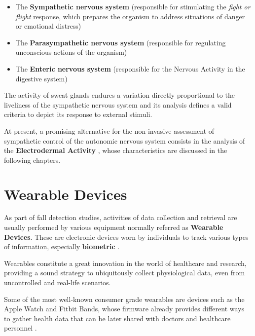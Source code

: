 \begin{itemize}
    \item The \textbf{Sympathetic nervous system} (responsible for stimulating the \textit{fight or flight} response, which prepares the organism to address situations of danger or emotional distress)
    \item The \textbf{Parasympathetic nervous system} (responsible for regulating unconscious actions of the organism)
    \item The \textbf{Enteric nervous system} (responsible for the Nervous Activity in the digestive system)
\end{itemize}

The activity of sweat glands endures a variation directly proportional to the liveliness of the sympathetic nervous system and its analysis defines a valid criteria to depict its response to external stimuli.

At present, a promising alternative for the non-invasive assessment of sympathetic control of the autonomic nervous system consists in the analysis of the \textbf{Electrodermal Activity} \cite{edaIntro1}, whose characteristics are discussed in the following chapters.

\section{Wearable Devices}\label{sec:wearables}


As part of fall detection studies, activities of data collection and retrieval are usually performed by various equipment normally referred as \textbf{Wearable Devices}. These are electronic devices worn by individuals to track various types of information, especially \textbf{biometric} \cite{wearablesDefinition}.

Wearables constitute a great innovation in the world of healthcare and research, providing a sound strategy to ubiquitously collect physiological data, even from uncontrolled and real-life scenarios.

Some of the most well-known consumer grade wearables are devices such as the Apple Watch and Fitbit Bands, whose firmware already provides different ways to gather health data that can be later shared with doctors and healthcare personnel \cite{wearablesBest}. 


